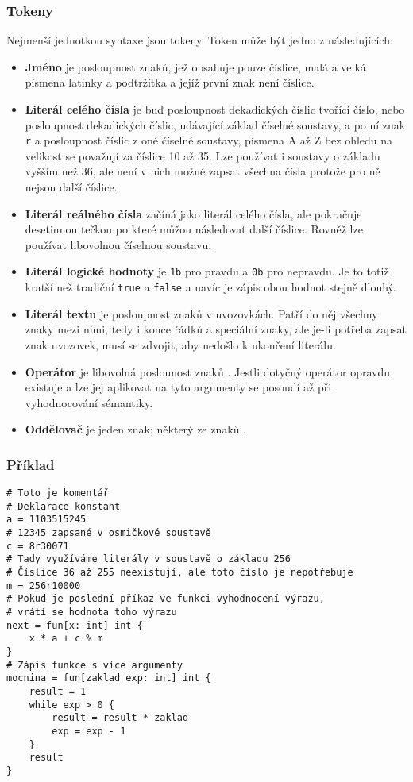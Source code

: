 \documentclass[a4paper,12pt]{article}
\def\circumflex{\char`\^}
\begin{document}
\subsubsection{Tokeny}
Nejmenší jednotkou syntaxe jsou tokeny. Token může být jedno z následujících:
\begin{itemize}
\item \textbf{Jméno} je posloupnost znaků, jež obsahuje pouze číslice, malá a velká písmena latinky a podtržítka a jejíž první znak není číslice.
\item \textbf{Literál celého čísla} je buď posloupnost dekadických číslic tvořící číslo, nebo posloupnost dekadických číslic, udávající základ číselné soustavy, a po ní znak \texttt{r} a posloupnost číslic z oné číselné soustavy, písmena A až Z bez ohledu na velikost se považují za číslice 10 až 35. Lze používat i soustavy o základu vyšším než 36, ale není v nich možné zapsat všechna čísla protože pro ně nejsou další číslice.
\item \textbf{Literál reálného čísla} začíná jako literál celého čísla, ale pokračuje desetinnou tečkou po které můžou následovat další číslice. Rovněž lze používat libovolnou číselnou soustavu.
\item \textbf{Literál logické hodnoty} je \texttt{1b} pro pravdu a \texttt{0b} pro nepravdu. Je to totiž kratší než tradiční \texttt{true} a \texttt{false} a navíc je zápis obou hodnot stejně dlouhý.
\item \textbf{Literál textu} je posloupnost znaků v uvozovkách. Patří do něj všechny znaky mezi nimi, tedy i konce řádků a speciální znaky, ale je-li potřeba zapsat znak uvozovek, musí se zdvojit, aby nedošlo k ukončení literálu.
\item \textbf{Operátor} je libovolná poslounost znaků \uv{\texttt{+-*/\%\&|\textasciitilde\circumflex<>=!}}. Jestli dotyčný operátor opravdu existuje a lze jej aplikovat na tyto argumenty se posoudí až při vyhodnocování sémantiky.
\item \textbf{Oddělovač} je jeden znak; některý ze znaků .
\end{itemize}

\subsubsection{Příklad}
\begin{verbatim}
# Toto je komentář
# Deklarace konstant
a = 1103515245
# 12345 zapsané v osmičkové soustavě
c = 8r30071
# Tady využíváme literály v soustavě o základu 256
# Číslice 36 až 255 neexistují, ale toto číslo je nepotřebuje
m = 256r10000
# Pokud je poslední příkaz ve funkci vyhodnocení výrazu,
# vrátí se hodnota toho výrazu
next = fun[x: int] int {
    x * a + c % m
}
# Zápis funkce s více argumenty
mocnina = fun[zaklad exp: int] int {
    result = 1
    while exp > 0 {
    	result = result * zaklad
    	exp = exp - 1
    }
    result
}
\end{verbatim}
\end{document}

